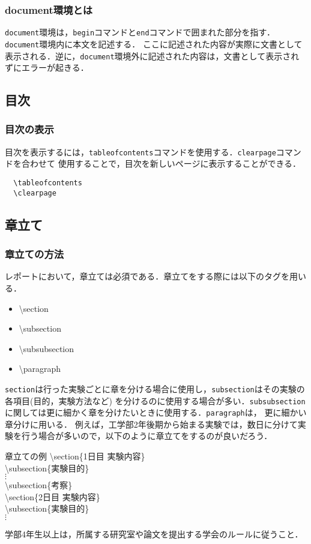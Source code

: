 \subsubsection{document環境とは}
\texttt{document}環境は，\texttt{begin}コマンドと\texttt{end}コマンドで囲まれた部分を指す．\texttt{document}環境内に本文を記述する．
ここに記述された内容が実際に文書として表示される．逆に，\texttt{document}環境外に記述された内容は，文書として表示されずにエラーが起きる．
\subsection{目次}
\subsubsection{目次の表示}
目次を表示するには，\texttt{tableofcontents}コマンドを使用する．\texttt{clearpage}コマンドを合わせて
使用することで，目次を新しいページに表示することができる．
\begin{lstlisting}
  \tableofcontents
  \clearpage
\end{lstlisting}
\subsection{章立て}
\subsubsection{章立ての方法}
レポートにおいて，章立ては必須である．章立てをする際には以下のタグを用いる．
\begin{itemize}
  \item \ttfamily \textbackslash section
  \item \textbackslash subsection
  \item \textbackslash subsubsection
  \item \textbackslash paragraph
\end{itemize}
\texttt{section}は行った実験ごとに章を分ける場合に使用し，\texttt{subsection}はその実験の各項目(目的，実験方法など)
を分けるのに使用する場合が多い．\texttt{subsubsection}に関しては更に細かく章を分けたいときに使用する．\texttt{paragraph}は，
更に細かい章分けに用いる．
\newpage
例えば，工学部2年後期から始まる実験では，数日に分けて実験を行う場合が多いので，以下のように章立てをするのが良いだろう．
\begin{itembox}[c]{章立ての例}
  \ttfamily
  \textbackslash section\{1日目 実験内容\}\\
  \textbackslash subsection\{実験目的\}\\
  $\vdots$\\
  \textbackslash subsection\{考察\}\\
  \textbackslash section\{2日目 実験内容\}\\
  \textbackslash subsection\{実験目的\}\\
  $\vdots$
\end{itembox}
学部4年生以上は，所属する研究室や論文を提出する学会のルールに従うこと．
